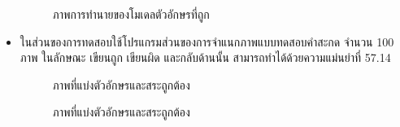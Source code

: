 \documentclass[12pt,oneside,openright,a4paper]{cpe-thai-project}
\begin{document}
\begin{itemize}
\begin{figure}[!h]
    \caption{ภาพการทำนายของโมเดลตัวอักษรที่ถูก}\label{fig:system}                  
   \end{figure}
   \item ในส่วนของการทดสอบใช้โปรแกรมส่วนของการจำแนกภาพแบบทดสอบคำสะกด จำนวน 100 ภาพ ในลักษณะ เขียนถูก เขียนผิด และกลับด้านนั้น สามารถทำได้ด้วยความแม่นยำที่ 57.14%
   \begin{figure}[!h]\centering
     \setlength{\fboxrule}{0.2mm} %
     \setlength{\fboxsep}{1cm}
     \caption{ภาพที่แบ่งตัวอักษรและสระถูกต้อง}\label{fig:system}                  
    \end{figure}
    \newpage
    \begin{figure}[!h]\centering
     \setlength{\fboxrule}{0.2mm} %
     \setlength{\fboxsep}{1cm}
     \caption{ภาพที่แบ่งตัวอักษรและสระถูกต้อง}\label{fig:system}                  
    \end{figure}

\end{itemize}
\end{document}
